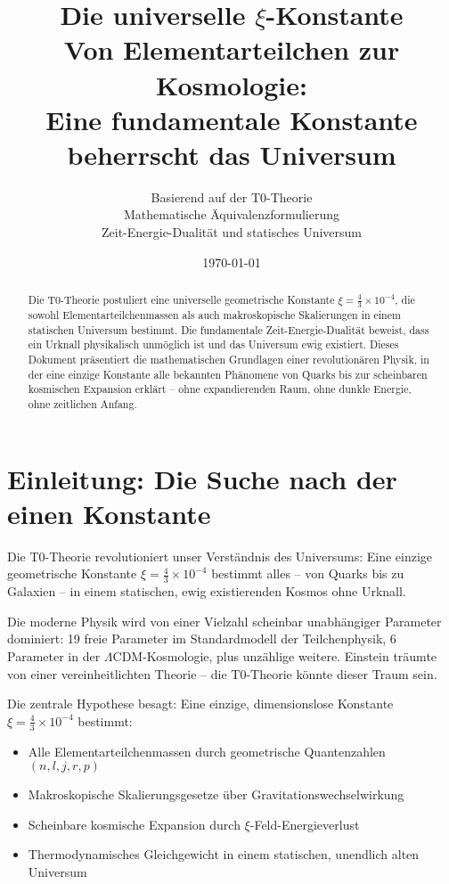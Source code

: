 \documentclass[12pt,a4paper]{article}
\title{\Huge\textbf{Die universelle $\xi$-Konstante}\\
	\Large Von Elementarteilchen zur Kosmologie: \\
	Eine fundamentale Konstante beherrscht das Universum}
\author{Basierend auf der T0-Theorie\\
	Mathematische Äquivalenzformulierung\\
	Zeit-Energie-Dualität und statisches Universum}
\date{\today}
\newcommand{\xiconst}{\xi = \frac{4}{3} \times 10^{-4}}
\theoremstyle{definition}
\begin{document}
	
	\maketitle
	
	\begin{abstract}
		Die T0-Theorie postuliert eine universelle geometrische Konstante $\xiconst$, die sowohl Elementarteilchenmassen als auch makroskopische Skalierungen in einem statischen Universum bestimmt. Die fundamentale Zeit-Energie-Dualität beweist, dass ein Urknall physikalisch unmöglich ist und das Universum ewig existiert. Dieses Dokument präsentiert die mathematischen Grundlagen einer revolutionären Physik, in der eine einzige Konstante alle bekannten Phänomene von Quarks bis zur scheinbaren kosmischen Expansion erklärt -- ohne expandierenden Raum, ohne dunkle Energie, ohne zeitlichen Anfang.
	\end{abstract}
	
	\tableofcontents
	\newpage
	
	\section{Einleitung: Die Suche nach der einen Konstante}
	
	\begin{important}
		Die T0-Theorie revolutioniert unser Verständnis des Universums: Eine einzige geometrische Konstante $\xiconst$ bestimmt alles -- von Quarks bis zu Galaxien -- in einem statischen, ewig existierenden Kosmos ohne Urknall.
	\end{important}
	
	Die moderne Physik wird von einer Vielzahl scheinbar unabhängiger Parameter dominiert: 19 freie Parameter im Standardmodell der Teilchenphysik, 6 Parameter in der $\Lambda$CDM-Kosmologie, plus unzählige weitere. Einstein träumte von einer vereinheitlichten Theorie -- die T0-Theorie könnte dieser Traum sein.
	
	Die zentrale Hypothese besagt: Eine einzige, dimensionslose Konstante $\xiconst$ bestimmt:
	\begin{itemize}
		\item Alle Elementarteilchenmassen durch geometrische Quantenzahlen $(n,l,j,r,p)$
		\item Makroskopische Skalierungsgesetze über Gravitationswechselwirkung
		\item Scheinbare kosmische Expansion durch $\xi$-Feld-Energieverlust
		\item Thermodynamisches Gleichgewicht in einem statischen, unendlich alten Universum
	\end{itemize}
	
\end{document}
